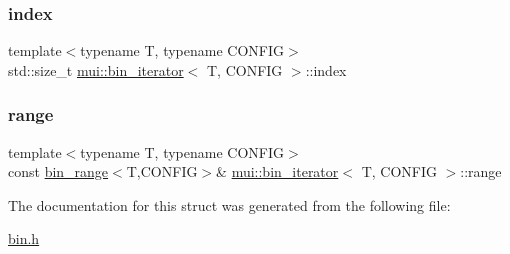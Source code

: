 \mbox{\label{structmui_1_1bin__iterator_a78c714939432311507baacc85de506e4}} 
\subsubsection{\texorpdfstring{index}{index}}
{\footnotesize\ttfamily template$<$typename T, typename C\+O\+N\+F\+IG$>$ \\
std\+::size\+\_\+t \hyperlink{structmui_1_1bin__iterator}{mui\+::bin\+\_\+iterator}$<$ T, C\+O\+N\+F\+IG $>$\+::index}

\mbox{\label{structmui_1_1bin__iterator_a371e739fe4b63c447a787572eb8ed055}} 
\subsubsection{\texorpdfstring{range}{range}}
{\footnotesize\ttfamily template$<$typename T, typename C\+O\+N\+F\+IG$>$ \\
const \hyperlink{structmui_1_1bin__range}{bin\+\_\+range}$<$T,C\+O\+N\+F\+IG$>$\& \hyperlink{structmui_1_1bin__iterator}{mui\+::bin\+\_\+iterator}$<$ T, C\+O\+N\+F\+IG $>$\+::range}



The documentation for this struct was generated from the following file\+:\begin{DoxyCompactItemize}
\item 
\hyperlink{bin_8h}{bin.\+h}\end{DoxyCompactItemize}
